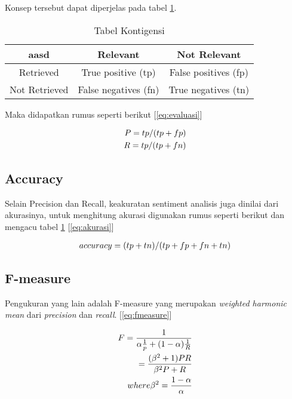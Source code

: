 Konsep tersebut dapat diperjelas pada tabel \ref{tab:konsep}.

\begin{table}[hbt]
	\caption{Tabel Kontigensi}
	\centering
		\begin{tabular}{*{3}{c}}%
			\toprule
			aasd & Relevant & Not Relevant \\
			\midrule
			Retrieved & True positive (tp) & False positives (fp) \\
			Not Retrieved & False negatives (fn) & True negatives (tn) \\
			\bottomrule
		\end{tabular}

	\label{tab:konsep}
\end{table}

Maka didapatkan rumus seperti berikut [\ref{eq:evaluasi}]

\begin{equation}
\begin{split}
\tiny
P = tp/(tp+fp) \\ 
R = tp/(tp+fn)
\label{eq:evaluasi}
\normalsize
\end{split}
\end{equation}

\subsection*{Accuracy}
Selain Precision dan Recall, keakuratan sentiment analisis juga dinilai dari akurasinya, untuk menghitung akurasi digunakan rumus seperti berikut dan mengacu tabel \ref{tab:konsep} [\ref{eq:akurasi}]

\begin{equation}
\begin{split}
\tiny
accuracy = (tp+tn)/(tp+fp+fn+tn)
\label{eq:akurasi}
\normalsize
\end{split}
\end{equation}

\subsection*{F-measure}
Pengukuran yang lain adalah F-measure yang merupakan \textit{weighted harmonic mean} dari \textit{precision} dan \textit{recall}. [\ref{eq:fmeasure}]

\begin{equation}
\begin{split}
\tiny
F = \frac{1}{\alpha \frac{1}{p} + (1 - \alpha)\frac{1}{R}} \\
= \frac{(\beta^2 + 1)PR}{\beta^2P + R} \\
where \beta^2 = \frac{1 - \alpha}{\alpha}
\label{eq:fmeasure}
\normalsize
\end{split}
\end{equation}

